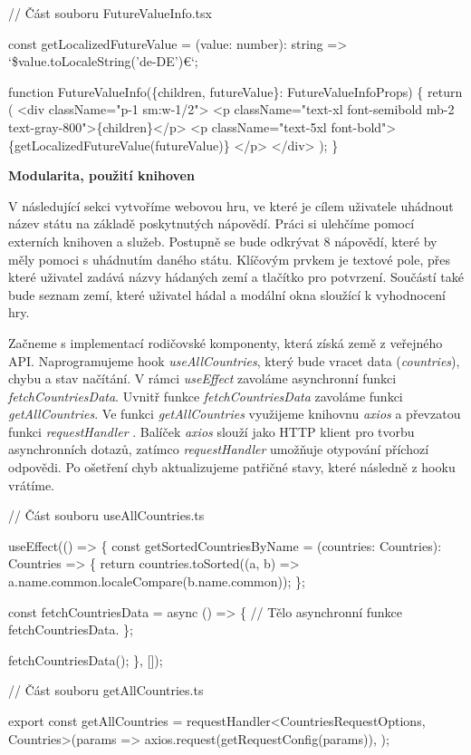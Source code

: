 \begin{prog}
// Část souboru FutureValueInfo.tsx

const getLocalizedFutureValue = (value: number): string => 
  `\${value.toLocaleString('de-DE')}€`;

function FutureValueInfo(\{children, futureValue\}: FutureValueInfoProps) \{
  return (
    <div className="p-1 sm:w-1/2">
      <p className="text-xl font-semibold mb-2 text-gray-800">\{children\}</p>
      <p className="text-5xl font-bold">
        \{getLocalizedFutureValue(futureValue)\}
      </p>
    </div>
  );
\}
\end{prog}

\begin{flushleft}
  \textbf{Modularita, použití knihoven}
\end{flushleft}

V následující sekci vytvoříme webovou hru, ve které je cílem uživatele uhádnout název státu na základě poskytnutých nápovědí. Práci si ulehčíme pomocí externích knihoven a služeb.
Postupně se bude odkrývat 8 nápovědí, které by měly pomoci s uhádnutím daného státu. Klíčovým prvkem je textové pole, přes které uživatel zadává názvy hádaných zemí a tlačítko pro potvrzení. 
Součástí také bude seznam zemí, které uživatel hádal a modální okna sloužící k vyhodnocení hry.

Začneme s implementací rodičovské komponenty, která získá země z veřejného API. Naprogramujeme hook \emph{useAllCountries}, který bude vracet data (\emph{countries}), chybu a stav načítání. 
V rámci \emph{useEffect} zavoláme asynchronní funkci \emph{fetchCountriesData}. Uvnitř funkce \emph{fetchCountriesData} zavoláme funkci \emph{getAllCountries}. 
Ve funkci \emph{getAllCountries} využijeme knihovnu \emph{axios} \cite{axioslib} a převzatou funkci \emph{requestHandler} \cite{axiosrequesthandler}. 
Balíček \emph{axios} slouží jako HTTP klient pro tvorbu asynchronních dotazů, zatímco \emph{requestHandler} umožňuje otypování příchozí odpovědi. Po ošetření chyb aktualizujeme patřičné stavy, které následně z hooku vrátíme. 

\begin{prog}
// Část souboru useAllCountries.ts

useEffect(() => \{
  const getSortedCountriesByName = (countries: Countries): Countries => \{
    return countries.toSorted((a, b) => 
      a.name.common.localeCompare(b.name.common));
  \};

  const fetchCountriesData = async () => \{
    // Tělo asynchronní funkce fetchCountriesData.
  \};

  fetchCountriesData();
\}, []);

// Část souboru getAllCountries.ts

export const getAllCountries = 
  requestHandler<CountriesRequestOptions, Countries>(params =>
    axios.request(getRequestConfig(params)),
  );
\end{prog}

